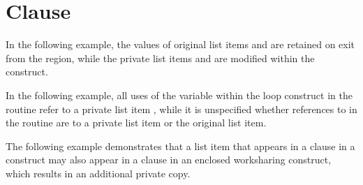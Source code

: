\section{ Clause}
\label{sec:private}

In the following example, the values of original list items  and  
are retained on exit from the  region, while the private list 
items  and  are modified within the  construct. 



In the following example, all uses of the variable  within the loop construct 
in the routine  refer to a private list item , while it is 
unspecified whether references to  in the routine  are to a 
private list item or the original list item.



The following example demonstrates that a list item that appears in a  
 clause in a  construct may also appear in a  
 clause in an enclosed worksharing construct, which results in an additional private 
copy.




